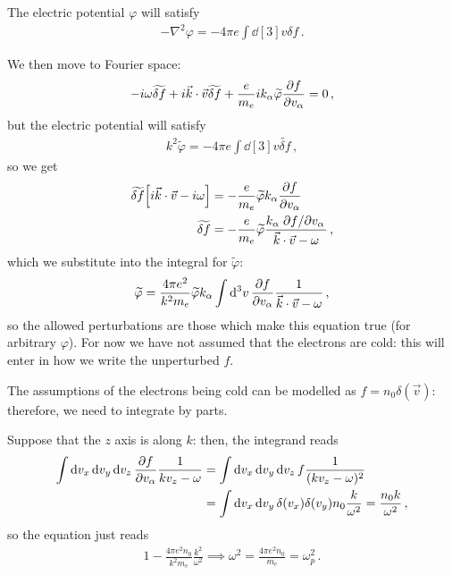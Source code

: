 \documentclass[main.tex]{subfiles}
\begin{document}
The electric potential \(\varphi \) will satisfy 
%
\begin{align}
- \nabla^2 \varphi = - 4 \pi e \int \dd[3]{v} \delta f
\,.
\end{align}

We then move to Fourier space: 
%
\begin{align}
- i \omega \widetilde{\delta f} + 
i \vec{k} \cdot \vec{v} \widetilde{\delta f} 
+ \frac{e}{m_e} i k_\alpha  \widetilde{\varphi} \pdv{f}{v_\alpha } = 0
\,,
\end{align}
%
but the electric potential will satisfy 
%
\begin{align}
k^2 \widetilde{\varphi} = - 4 \pi e \int \dd[3]{v} \widetilde{\delta f} 
\,,
\end{align}
%
so we get 
%
\begin{align}
\widetilde{\delta f} \qty[ i \vec{k} \cdot \vec{v} - i \omega ] &= 
- \frac{e}{m_e} \widetilde{\varphi} k_\alpha \pdv{f}{v_\alpha }  \\
\widetilde{\delta f} &= - \frac{e}{m_e} \widetilde{\varphi} \frac{k_\alpha \pdv*{f}{v_\alpha }}{\vec{k} \cdot \vec{v} - \omega }  
\,,
\end{align}
%
which we substitute into the integral for \(\widetilde{\varphi}\): 
%
\begin{align}
\widetilde{\varphi} = \frac{4 \pi e^2}{k^2m_e} \widetilde{\varphi} k_\alpha \int \dd[3]{v}  \pdv{f}{v_\alpha } \frac{1}{\vec{k} \cdot \vec{v} - \omega }
\,,
\end{align}
%
so the allowed perturbations are those which make this equation true (for arbitrary \(\varphi \)). 
For now we have not assumed that the electrons are cold: this will enter in how we write the unperturbed \(f\). 

The assumptions of the electrons being cold can be modelled as \(f = n_0 \delta (\vec{v})\): therefore, we need to integrate by parts. 

Suppose that the \(z\) axis is along \(k\): then, the integrand reads 
%
\begin{align}
\int \dd{v_x} \dd{v_y} \dd{v_z} \pdv{f}{v_\alpha } \frac{1}{k v_z - \omega } &=
\int \dd{v_x} \dd{v_y} \dd{v_z} f \frac{1}{(k v_z - \omega)^2 }  \\
&= \int \dd{v_x} \dd{v_y} \delta (v_x) \delta (v_y) n_0 \frac{k}{\omega^2} = \frac{n_0 k }{ \omega^2}
\,,
\end{align}
%
so the equation just reads 
%
\begin{align}
1 - \frac{4 \pi e^2 n_0 }{k^2 m_e} \frac{k^2}{\omega^2} \implies \omega^2 = \frac{4 \pi e^2 n_0 }{m_e} = \omega_p^2
\,.
\end{align}
\end{document}
